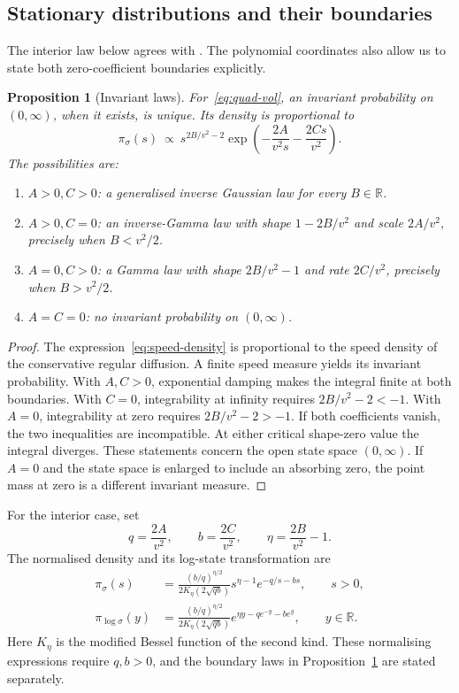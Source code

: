 \documentclass[11pt,a4paper]{article}
\newtheorem{proposition}{Proposition}[section]
\theoremstyle{definition}
\theoremstyle{remark}
\newcommand{\RR}{\mathbb{R}}
\begin{document}
\subsection{Stationary distributions and their boundaries}

The interior law below agrees with \citet[Proposition~3.1]{CarrWillems2019}. The polynomial coordinates also allow us to state both zero-coefficient boundaries explicitly.

\begin{proposition}[Invariant laws]
\label{prop:stationary}
For~\eqref{eq:quad-vol}, an invariant probability on \((0,\infty)\), when it exists, is unique. Its density is proportional to
\begin{equation}
 \pi_\sigma(s)\ \propto\
 s^{2B/v^2-2}\exp\left(-\frac{2A}{v^2s}-\frac{2Cs}{v^2}\right).
 \label{eq:speed-density}
\end{equation}
The possibilities are:
\begin{enumerate}
\item \(A>0,C>0\): a generalised inverse Gaussian law for every \(B\in\RR\).
\item \(A>0,C=0\): an inverse-Gamma law with shape \(1-2B/v^2\) and scale \(2A/v^2\), precisely when \(B<v^2/2\).
\item \(A=0,C>0\): a Gamma law with shape \(2B/v^2-1\) and rate \(2C/v^2\), precisely when \(B>v^2/2\).
\item \(A=C=0\): no invariant probability on \((0,\infty)\).
\end{enumerate}
\end{proposition}

\begin{proof}
The expression~\eqref{eq:speed-density} is proportional to the speed density of the conservative regular diffusion. A finite speed measure yields its invariant probability. With \(A,C>0\), exponential damping makes the integral finite at both boundaries. With \(C=0\), integrability at infinity requires \(2B/v^2-2<-1\). With \(A=0\), integrability at zero requires \(2B/v^2-2>-1\). If both coefficients vanish, the two inequalities are incompatible. At either critical shape-zero value the integral diverges. These statements concern the open state space \((0,\infty)\). If \(A=0\) and the state space is enlarged to include an absorbing zero, the point mass at zero is a different invariant measure.
\end{proof}

For the interior case, set
\[
 q=\frac{2A}{v^2},\qquad b=\frac{2C}{v^2},\qquad
 \eta=\frac{2B}{v^2}-1.
\]
The normalised density and its log-state transformation are
\begin{align}
 \pi_\sigma(s)&=\frac{(b/q)^{\eta/2}}{2K_\eta(2\sqrt{qb})}
        s^{\eta-1}e^{-q/s-bs},\qquad s>0,\label{eq:gig}\\
 \pi_{\log\sigma}(y)&=\frac{(b/q)^{\eta/2}}{2K_\eta(2\sqrt{qb})}
        e^{\eta y-qe^{-y}-be^y},\qquad y\in\RR.\label{eq:loggig}
\end{align}
Here \(K_\eta\) is the modified Bessel function of the second kind. These normalising expressions require \(q,b>0\), and the boundary laws in Proposition~\ref{prop:stationary} are stated separately.
\end{document}
